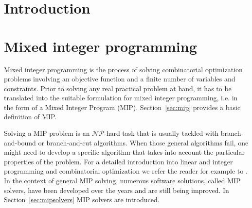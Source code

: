 \documentclass[a4paper,12pt,twoside]{scrbook}
\begin{document}
\tableofcontents

\pagestyle{headings}

\mainmatter

\chapter{Introduction}


\chapter{Mixed integer programming}
Mixed integer programming is the process of solving combinatorial optimization problems involving an objective function and a finite number of variables and constraints. Prior to solving any real practical problem at hand, it has to be translated into the suitable formulation for mixed integer programming, i.e. in the form of a Mixed Integer Program (MIP). Section~\ref{sec:mip} provides a basic definition of MIP. \par 
Solving a MIP problem is an $\mathcal{NP}$-hard task that is usually tackled with branch-and-bound or branch-and-cut algorithms.
When those general algorithms fail, one might need to develop a specific algorithm that takes into account the particular properties of the problem.
For a detailed introduction into linear and integer programming and combinatorial optimization we refer the reader for example to \cite{fischetti2019}.
In the context of general MIP solving, numerous software solutions, called MIP solvers, have been developed over the years and are still being improved. In Section~\ref{sec:mipsolvers} MIP solvers are introduced.
\end{document}
